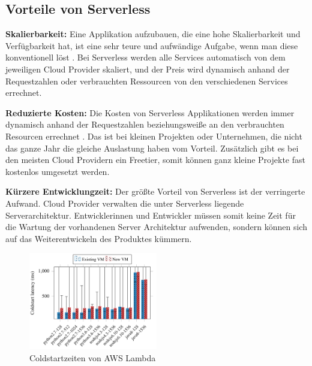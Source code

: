 \subsection{Vorteile von Serverless}

\begin{flushleft}

\textbf{Skalierbarkeit:} Eine Applikation aufzubauen, die eine hohe Skalierbarkeit und Verfügbarkeit hat, ist eine sehr teure und aufwändige Aufgabe, wenn man diese konventionell löst \autocite[]{Ma} \autocite[]{Bryhni}. Bei Serverless werden alle Services automatisch von dem jeweiligen Cloud Provider skaliert, und der Preis wird dynamisch anhand der Requestzahlen oder verbrauchten Ressourcen von den verschiedenen Services errechnet. \autocite[]{Muthusamy2017} \break


\textbf{Reduzierte Kosten:} Die Kosten von Serverless Applikationen werden immer dynamisch anhand der Requestzahlen beziehungsweiße an den verbrauchten Resourcen errechnet \autocite[]{VanEyk2017} \autocite[]{Malawski}. Das ist bei kleinen Projekten oder Unternehmen, die nicht das ganze Jahr die gleiche Auslastung haben vom Vorteil. Zusätzlich gibt es bei den meisten Cloud Providern ein Freetier, somit können ganz kleine Projekte fast kostenlos umgesetzt werden. \break



\textbf{Kürzere Entwicklungzeit:} Der größte Vorteil von Serverless ist der verringerte Aufwand. Cloud Provider verwalten die unter Serverless liegende Serverarchitektur. Entwicklerinnen und Entwickler müssen somit keine Zeit für die Wartung der vorhandenen Server Architektur aufwenden, sondern können sich auf das Weiterentwickeln des Produktes kümmern. \autocite[]{Baldini}

\end{flushleft}

\begin{figure}[t]
	\centering
	\includegraphics[width=0.5\textwidth]{images/Coldstarts.png}
	\caption{
		Coldstartzeiten von AWS Lambda \autocite[]{Wang}
	}
	\label{figure:Coldstarts}
\end{figure}

